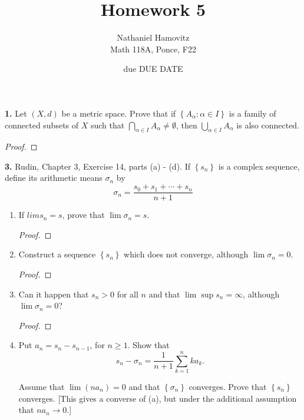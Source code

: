 \documentclass{article}
\newcommand{\set}[1]{\left\{ #1 \right\}}
\begin{document}
\renewcommand{\labelenumi}{(\alph{enumi})}


\title{Homework 5} %
\author{Nathaniel Hamovitz\\Math 118A, Ponce, F22}
\date{due DUE DATE}

\maketitle

\textbf{1. }
Let $(X, d)$ be a metric space. Prove that if $\set{A_\alpha : \alpha \in I}$ is a family of connected subsets of $X$ such that $\displaystyle \bigcap_{\alpha \in I} A_\alpha \ne \emptyset$, then $\displaystyle \bigcup_{\alpha \in I} A_\alpha$ is also connected.

\begin{proof}
    
\end{proof}

\newpage %

\textbf{3. }
Rudin, Chapter 3, Exercise 14, parts (a) - (d). If $\set{s_n}$ is a complex sequence, define its arithmetic means $\sigma_n$ by
$$\sigma_n = \frac{s_0 + s_1 + \cdots + s_n}{n + 1}$$

\begin{enumerate}
    \item 
    If $lim s_n = s$, prove that $\lim \sigma_n = s$.
    \begin{proof}
        
    \end{proof}


    \item 
    Construct a sequence $\set{s_n}$ which does not converge, although $\lim \sigma_n = 0$.
    \begin{proof}
        
    \end{proof}


    \item
    Can it happen that $s_n > 0$ for all $n$ and that $\lim \sup s_n = \infty$, although $\lim \sigma_n = 0$?
    \begin{proof}
        
    \end{proof}


    \item
    Put $a_n = s_n - s_{n - 1}$, for $n \ge 1$. Show that
    $$s_n - \sigma_n = \frac{1}{n + 1} \sum_{k = 1}^n k a_k.$$

    Assume that $\lim (n a_n) = 0$ and that $\set{\sigma_n}$ converges. Prove that $\set{s_n}$ converges. [This gives a converse of (a), but under the additional assumption that $n a_n \to 0$.]
\end{enumerate}
\end{document}
